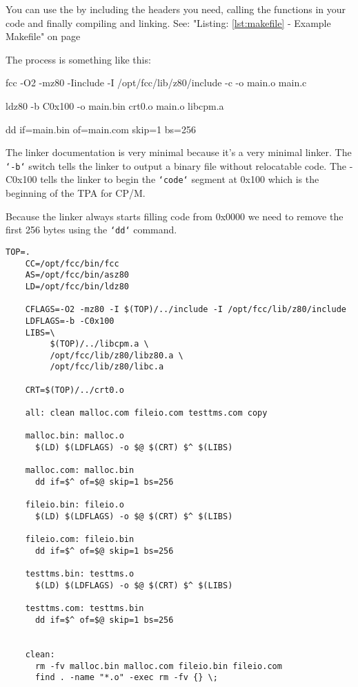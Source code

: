 \documentclass[10pt,a4paper,hidelinks]{article}
\begin{document}
You can use the by including the headers you need, calling the functions in
your code and finally compiling and linking. See: "Listing: \ref{lst:makefile}
- Example Makefile" on page \pageref{lst:makefile}

The process is something like this:

\begin{description}[font=$\bullet$~\normalfont\scshape\color{red!50!black}]
  \item[Compile] fcc -O2 -mz80 -Iinclude -I /opt/fcc/lib/z80/include -c -o
    main.o main.c
  \item[Link] ldz80 -b C0x100 -o main.bin crt0.o main.o libcpm.a
  \item[Truncate] dd if=main.bin of=main.com skip=1 bs=256
\end{description}

The linker documentation is very minimal because it's a very minimal linker.
The \texttt{`-b`} switch tells the linker to output a binary file without
relocatable code.  The -C0x100 tells the linker to begin the \texttt{`code`}
segment at 0x100 which is the beginning of the TPA for CP/M.

Because the linker always starts filling code from 0x0000 we need to remove the
first 256 bytes using the \texttt{`dd`} command.
\pagebreak

\begin{center}
  \begin{lstlisting}[caption=Example Makefile]
    TOP=.
    CC=/opt/fcc/bin/fcc
    AS=/opt/fcc/bin/asz80
    LD=/opt/fcc/bin/ldz80

    CFLAGS=-O2 -mz80 -I $(TOP)/../include -I /opt/fcc/lib/z80/include
    LDFLAGS=-b -C0x100
    LIBS=\
         $(TOP)/../libcpm.a \
         /opt/fcc/lib/z80/libz80.a \
         /opt/fcc/lib/z80/libc.a

    CRT=$(TOP)/../crt0.o

    all: clean malloc.com fileio.com testtms.com copy

    malloc.bin: malloc.o
      $(LD) $(LDFLAGS) -o $@ $(CRT) $^ $(LIBS)

    malloc.com: malloc.bin
      dd if=$^ of=$@ skip=1 bs=256

    fileio.bin: fileio.o
      $(LD) $(LDFLAGS) -o $@ $(CRT) $^ $(LIBS)

    fileio.com: fileio.bin
      dd if=$^ of=$@ skip=1 bs=256

    testtms.bin: testtms.o
      $(LD) $(LDFLAGS) -o $@ $(CRT) $^ $(LIBS)

    testtms.com: testtms.bin
      dd if=$^ of=$@ skip=1 bs=256


    clean:
      rm -fv malloc.bin malloc.com fileio.bin fileio.com
      find . -name "*.o" -exec rm -fv {} \;
  \end{lstlisting}
\end{center}
\label{lst:makefile}
\end{document}
